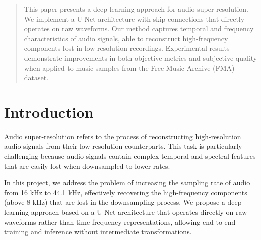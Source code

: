 \documentclass{article}
\begin{document}

\printAffiliationsAndNotice

\begin{abstract}
This paper presents a deep learning approach for audio super-resolution.
We implement a U-Net architecture with skip connections that directly operates on raw waveforms.
Our method captures temporal and frequency characteristics of audio signals, able to reconstruct high-frequency components lost in low-resolution recordings.
Experimental results demonstrate improvements in both objective metrics and subjective quality when applied to music samples from the Free Music Archive (FMA) dataset.
\end{abstract}

\section{Introduction}

Audio super-resolution refers to the process of reconstructing high-resolution audio signals from their low-resolution counterparts. 
This task is particularly challenging because audio signals contain complex temporal and spectral features that are easily lost when downsampled to lower rates.

In this project, we address the problem of increasing the sampling rate of audio from 16 kHz to 44.1 kHz, effectively recovering the high-frequency components (above 8 kHz) that are lost in the downsampling process.
We propose a deep learning approach based on a U-Net architecture that operates directly on raw waveforms rather than time-frequency representations, allowing end-to-end training and inference without intermediate transformations.
\end{document}
